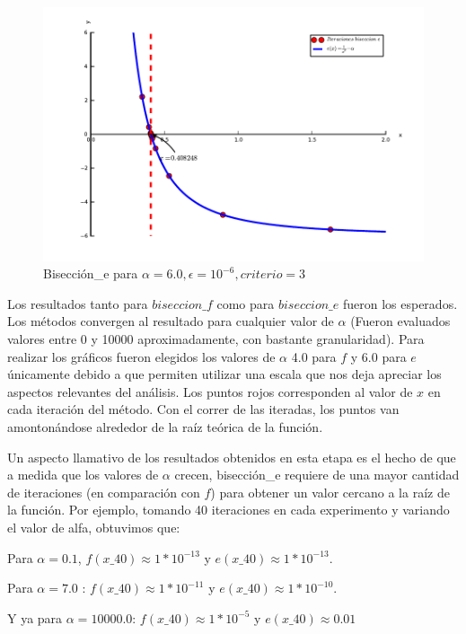 \begin{figure}[!h]
	\begin{center}
		  \includegraphics[keepaspectratio]{../Imagenes/exp1/biseccion_e.pdf}
		  \caption{Bisección\_e para $\alpha=6.0, \epsilon = 10^{-6}, criterio = 3$}
		  \label{fig:contra1}
	\end{center}
\end{figure}
\FloatBarrier
Los resultados tanto para $biseccion\_f$ como para $biseccion\_e$ fueron los esperados. Los métodos convergen al resultado para cualquier valor de $\alpha$ (Fueron evaluados valores entre 0 y 10000 aproximadamente,
con bastante granularidad). Para realizar los gráficos fueron elegidos los valores de $\alpha$ 4.0 para $f$ y 6.0 para $e$ únicamente debido a que permiten utilizar una escala que nos deja apreciar los aspectos
relevantes del análisis. Los puntos rojos corresponden al valor de $x$ en cada iteración del método. Con el correr de las iteradas, los puntos van amontonándose alrededor de la raíz teórica de la función.

Un aspecto llamativo de los resultados obtenidos en esta etapa es el hecho de que 
a medida que los valores de $\alpha$ crecen, bisección\_e requiere de una mayor cantidad de iteraciones (en comparación con $f$) para obtener un valor cercano a la raíz de la función. Por ejemplo,
tomando 40 iteraciones en cada experimento y variando el valor de alfa, obtuvimos que: 

Para $\alpha = 0.1$, $f(x\_40) \approx 1*10^{-13}$ y $e(x\_40) \approx 1*10^{-13}$. 

Para $\alpha = 7.0$ : 
$f(x\_40) \approx 1*10^{-11}$ y $e(x\_40) \approx 1*10^{-10}$. 

Y ya para $\alpha = 10000.0$: $f(x\_40) \approx 1*10^{-5}$ y $e(x\_40) \approx 0.01$

